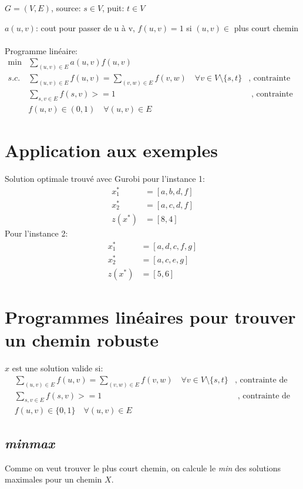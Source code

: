 \documentclass[10pt,a4paper]{report}
\begin{document}
$G=(V,E)$, source: $s \in V$, puit: $t \in V$

$a(u,v)$: cout pour passer de u à v, $f(u,v)=1$ si $(u,v) \in $ {plus court chemin}\\\\
Programme linéaire:
\begin{align*}
\min&\sum_{(u,v)\in E} a(u,v)f(u,v)&\\
s.c.& \sum_{(u,v)\in E}f(u,v) = \sum_{(v,w)\in E}f(v,w) \quad \forall v \in V \setminus \{s, t\}& \text{, contrainte de conservation du flux}\\
    & \sum_{s,v \in E} f(s,v) >= 1 &\text{ , contrainte de flux sortant de la source}\\
    &f(u,v)\in (0,1) \quad \forall (u,v) \in E&
\end{align*}
\section{Application aux exemples}
Solution optimale trouvé avec Gurobi pour l'instance 1:
\begin{align*}
	x_1^{*} 	&= [a, b, d, f]\\
	x_2^*		&= [a, c, d, f]\\
	z(x^{*}) 	&= [8, 4]
\end{align*}
Pour l'instance 2:
\begin{align*}
	x_1^{*} 	&= [a, d, c, f, g]\\
	x_2^*		&= [a, c, e, g]\\
	z(x^{*}) 	&= [5, 6]
\end{align*}
\section{Programmes linéaires pour trouver un chemin robuste}
$x$ est une solution valide si:
\begin{align*}
           & \sum_{(u,v)\in E}f(u,v) = \sum_{(v,w)\in E}f(v,w) \quad \forall v \in V \setminus \{s, t\}& \text{, contrainte de conservation du flux}\\
            & \sum_{s,v \in E} f(s,v) >= 1 &\text{ , contrainte de flux sortant de la source}&\\
            &f(u,v)\in \{0,1\} \quad \forall (u,v) \in E&
\end{align*}
\subsection*{\textit{minmax}}
Comme on veut trouver le plus court chemin, on calcule le \textit{min} des solutions maximales pour un chemin $X$.
\end{document}
